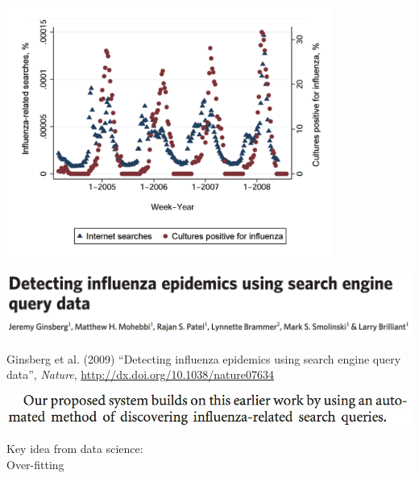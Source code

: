 \documentclass[aspectratio=169]{beamer}
\def\vf{\vfill}
\begin{document}
\begin{frame}

\begin{center}
\includegraphics[width=0.8\textwidth]{figures/polgreen_using_2008_fig1}
\end{center}

\end{frame}
\begin{frame}

\begin{center}
\includegraphics[width=\textwidth]{figures/ginsberg_detecting_2009_title}
\end{center}

\vf
Ginsberg et al. (2009) ``Detecting influenza epidemics using search engine query data'', \textit{Nature}, \url{http://dx.doi.org/10.1038/nature07634}

\end{frame}
\begin{frame}

\begin{center}
\includegraphics[width=\textwidth]{figures/ginsberg_detecting_2009_data}
\end{center}

\end{frame}
\begin{frame}

Key idea from data science:\\
Over-fitting

\end{frame}
\end{document}
